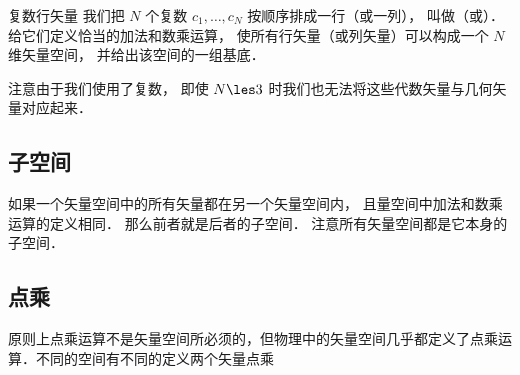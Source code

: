 \begin{exer}{复数行矢量}
我们把 $N$ 个复数 $c_1, \dots, c_N$ 按顺序排成一行（或一列）， 叫做（或）． 给它们定义恰当的加法和数乘运算， 使所有行矢量（或列矢量）可以构成一个 $N$ 维矢量空间， 并给出该空间的一组基底．

注意由于我们使用了复数， 即使 $N \les 3$ 时我们也无法将这些代数矢量与几何矢量对应起来．
\end{exer}

\subsection{子空间}
如果一个矢量空间中的所有矢量都在另一个矢量空间内， 且量空间中加法和数乘运算的定义相同． 那么前者就是后者的子空间． 注意所有矢量空间都是它本身的子空间．



\subsection{点乘}
原则上点乘运算不是矢量空间所必须的，但物理中的矢量空间几乎都定义了点乘运算．不同的空间有不同的定义两个矢量点乘

